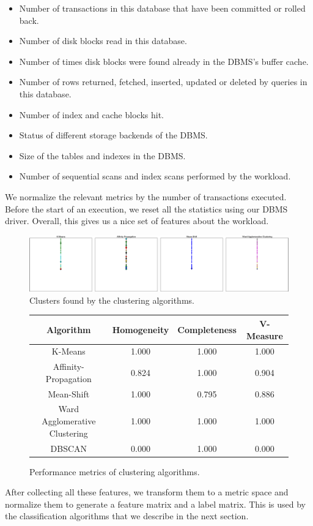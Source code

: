   \begin{itemize}    
    \item {Number of transactions in this database that have been committed or
    rolled back.}
    \item {Number of disk blocks read in this database.}
    \item {Number of times disk blocks were found already in the DBMS's buffer
    cache.}
    \item {Number of rows returned, fetched, inserted, updated or deleted by
    queries in this database.}
    \item {Number of index and cache blocks hit.}
    \item {Status of different storage backends of the DBMS.}
    \item {Size of the tables and indexes in the DBMS.}
    \item {Number of sequential scans and index scans performed by the
    workload.}
  \end{itemize}
  
  	We normalize the relevant metrics by the number of transactions executed.
  	Before the start of an execution, we reset all the statistics using our
  	DBMS driver. Overall, this gives us a nice set of features about the
  	workload. 

\begin{figure}
    \centering
    \includegraphics[width=\textwidth]{figure/clustering.pdf}
    \caption{Clusters found by the clustering algorithms.}
    \label{fig:clusters}
\end{figure}

\begin{figure}[h]
    \centering
    \begin{tabular}{c c c c}
      \toprule
      Algorithm                     & Homogeneity & Completeness & V-Measure \\
      \midrule
      K-Means                       & 1.000       & 1.000        & 1.000     \\
      Affinity-Propagation          & 0.824       & 1.000        & 0.904     \\
      Mean-Shift                    & 1.000       & 0.795        & 0.886     \\
      Ward Agglomerative Clustering & 1.000       & 1.000        & 1.000     \\
      DBSCAN                        & 0.000       & 1.000        & 0.000     \\
      \bottomrule
    \end{tabular}

    \caption{Performance metrics of clustering algorithms.}
    \label{fig:clustering-metrics}
\end{figure}

After collecting all these features, we transform them to a metric space and
normalize them to generate a feature matrix and a label matrix. This is 
used by the classification algorithms that we describe in the next section.
